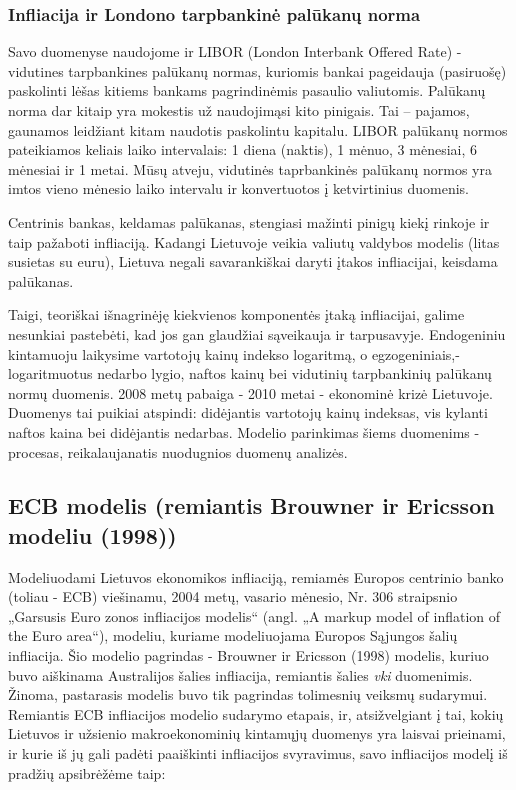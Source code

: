 \documentclass[a4paper]{article}
\begin{document}
\subsubsection{Infliacija ir Londono tarpbankinė palūkanų norma} \indent

Savo duomenyse naudojome ir LIBOR (London Interbank Offered Rate) - vidutines tarpbankines palūkanų normas, kuriomis bankai pageidauja (pasiruošę) paskolinti lėšas kitiems bankams pagrindinėmis pasaulio valiutomis. Palūkanų norma dar kitaip yra mokestis už naudojimąsi kito pinigais. Tai – pajamos, gaunamos leidžiant kitam naudotis paskolintu kapitalu. LIBOR palūkanų normos pateikiamos keliais laiko intervalais: 1 diena (naktis), 1 mėnuo, 3 mėnesiai, 6 mėnesiai ir 1 metai. Mūsų atveju, vidutinės taprbankinės palūkanų normos yra imtos vieno mėnesio laiko intervalu ir konvertuotos į ketvirtinius duomenis.

Centrinis bankas, keldamas palūkanas, stengiasi mažinti pinigų kiekį rinkoje ir taip pažaboti infliaciją. Kadangi Lietuvoje veikia valiutų valdybos modelis (litas susietas su euru), Lietuva negali savarankiškai daryti įtakos infliacijai, keisdama palūkanas.

Taigi, teoriškai išnagrinėję kiekvienos komponentės įtaką infliacijai, galime nesunkiai pastebėti, kad jos gan glaudžiai sąveikauja ir tarpusavyje. Endogeniniu kintamuoju laikysime vartotojų kainų indekso logaritmą, o egzogeniniais,- logaritmuotus nedarbo lygio, naftos kainų bei vidutinių tarpbankinių palūkanų normų duomenis. 2008 metų pabaiga - 2010 metai - ekonominė krizė Lietuvoje. Duomenys tai puikiai atspindi: didėjantis vartotojų kainų indeksas, vis kylanti naftos kaina bei didėjantis nedarbas. Modelio parinkimas šiems duomenims - procesas, reikalaujanatis nuodugnios duomenų analizės.
\newpage

	\subsection{ECB modelis (remiantis Brouwner ir Ericsson modeliu (1998))} \indent
		
Modeliuodami Lietuvos ekonomikos infliaciją, remiamės Europos centrinio banko (toliau - ECB) viešinamu, 2004 metų, vasario mėnesio, Nr. 306 straipsnio „Garsusis Euro zonos infliacijos modelis“ (angl. „A markup model of inflation of  the Euro area“), modeliu, kuriame modeliuojama Europos Sąjungos šalių infliacija. Šio modelio pagrindas - Brouwner ir Ericsson (1998) modelis, kuriuo buvo aiškinama Australijos šalies infliacija, remiantis šalies \textit{vki} duomenimis. Žinoma, pastarasis modelis buvo tik pagrindas tolimesnių veiksmų sudarymui. Remiantis ECB infliacijos modelio sudarymo etapais, ir, atsižvelgiant į tai, kokių Lietuvos ir užsienio makroekonominių kintamųjų duomenys yra laisvai prieinami, ir kurie iš jų gali padėti paaiškinti infliacijos svyravimus, savo infliacijos modelį iš pradžių apsibrėžėme taip:
\end{document}
